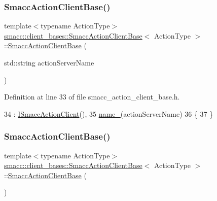 \subsubsection{\texorpdfstring{Smacc\+Action\+Client\+Base()}{SmaccActionClientBase()}\hspace{0.1cm}{\footnotesize\ttfamily [1/2]}}
{\footnotesize\ttfamily template$<$typename Action\+Type$>$ \\
\hyperlink{classsmacc_1_1client__bases_1_1SmaccActionClientBase}{smacc\+::client\+\_\+bases\+::\+Smacc\+Action\+Client\+Base}$<$ Action\+Type $>$\+::\hyperlink{classsmacc_1_1client__bases_1_1SmaccActionClientBase}{Smacc\+Action\+Client\+Base} (\begin{DoxyParamCaption}\item[{std\+::string}]{action\+Server\+Name }\end{DoxyParamCaption})\hspace{0.3cm}{\ttfamily [inline]}}



Definition at line 33 of file smacc\+\_\+action\+\_\+client\+\_\+base.\+h.


\begin{DoxyCode}
34         : \hyperlink{classsmacc_1_1client__bases_1_1ISmaccActionClient_a379f2672d1b971422821026ca90eb96a}{ISmaccActionClient}(),
35           \hyperlink{classsmacc_1_1client__bases_1_1SmaccActionClientBase_a7f2e1834e915bdf7ae9db8b90b4597e6}{name\_}(actionServerName)
36     \{
37     \}
\end{DoxyCode}
\mbox{\label{classsmacc_1_1client__bases_1_1SmaccActionClientBase_a942113f29871c3e2c3fff9e951500805}} 
\subsubsection{\texorpdfstring{Smacc\+Action\+Client\+Base()}{SmaccActionClientBase()}\hspace{0.1cm}{\footnotesize\ttfamily [2/2]}}
{\footnotesize\ttfamily template$<$typename Action\+Type$>$ \\
\hyperlink{classsmacc_1_1client__bases_1_1SmaccActionClientBase}{smacc\+::client\+\_\+bases\+::\+Smacc\+Action\+Client\+Base}$<$ Action\+Type $>$\+::\hyperlink{classsmacc_1_1client__bases_1_1SmaccActionClientBase}{Smacc\+Action\+Client\+Base} (\begin{DoxyParamCaption}{ }\end{DoxyParamCaption})\hspace{0.3cm}{\ttfamily [inline]}}



